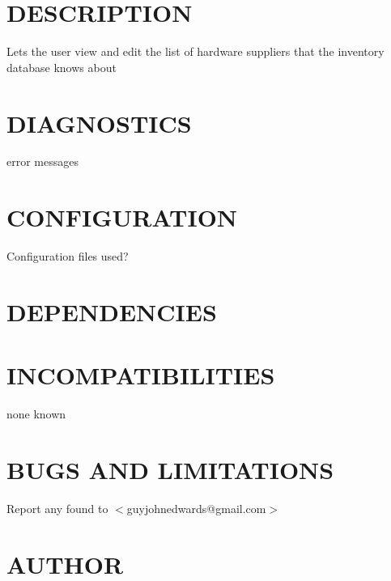 \documentclass{book}
\begin{document}
\section{DESCRIPTION}
\label{_DESCRIPTION}
\hypertarget{_DESCRIPTION}{}



Lets the user view and edit the list of hardware suppliers that the inventory database knows about


\section{DIAGNOSTICS}
\label{_DIAGNOSTICS}
\hypertarget{_DIAGNOSTICS}{}



error messages


\section{CONFIGURATION}
\label{_CONFIGURATION}
\hypertarget{_CONFIGURATION}{}



Configuration files used?


\section{DEPENDENCIES}
\label{_DEPENDENCIES}
\hypertarget{_DEPENDENCIES}{}


\section{INCOMPATIBILITIES}
\label{_INCOMPATIBILITIES}
\hypertarget{_INCOMPATIBILITIES}{}



none known


\section{BUGS AND LIMITATIONS}
\label{_BUGS_AND_LIMITATIONS}
\hypertarget{_BUGS_AND_LIMITATIONS}{}



Report any found to $<$guyjohnedwards@gmail.com$>$


\section{AUTHOR}
\label{_AUTHOR}
\hypertarget{_AUTHOR}{}
\end{document}
